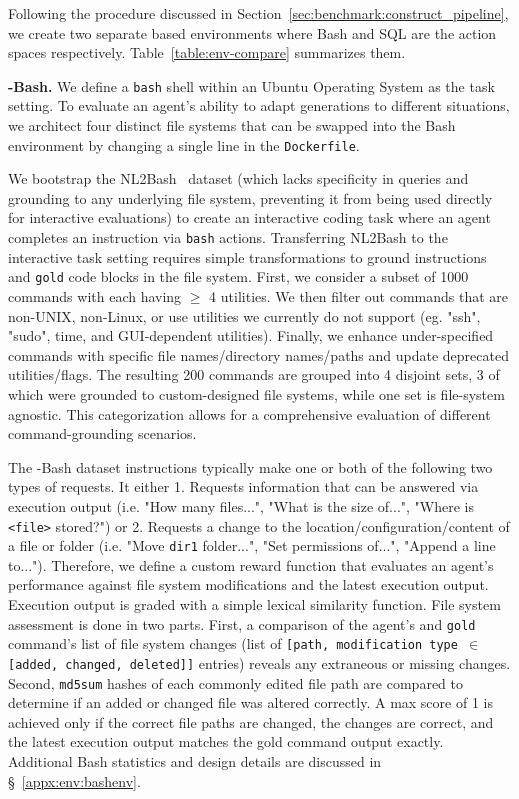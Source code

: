 Following the procedure discussed in Section~\ref{sec:benchmark:construct_pipeline}, we create two separate \benchmark{} based environments where Bash and SQL are the action spaces respectively. Table~\ref{table:env-compare} summarizes them.



\textbf{\benchmark{}-Bash.} We define a \texttt{bash} shell within an Ubuntu Operating System as the task setting.
To evaluate an agent's ability to adapt generations to different situations, we architect four distinct file systems that can be swapped into the Bash environment by changing a single line in the \texttt{Dockerfile}.

We bootstrap the NL2Bash~\cite{lin-etal-2018-nl2bash} dataset (which lacks specificity in queries and grounding to any underlying file system, preventing it from being used directly for interactive evaluations) to create an interactive coding task where an agent completes an instruction via \texttt{bash} actions. Transferring NL2Bash to the interactive task setting requires simple transformations to ground instructions and \texttt{gold} code blocks in the file system. First, we consider a subset of 1000 commands with each having $\geq$ 4 utilities. We then filter out commands that are non-UNIX, non-Linux, or use utilities we currently do not support (eg. "ssh", "sudo", time, and GUI-dependent utilities). Finally, we enhance under-specified commands with specific file names/directory names/paths and update deprecated utilities/flags. The resulting 200 commands are grouped into 4 disjoint sets, 3 of which were grounded to custom-designed file systems, while one set is file-system agnostic. This categorization allows for a comprehensive evaluation of different command-grounding scenarios.

The \benchmark{}-Bash dataset instructions typically make one or both of the following two types of requests. It either
1. Requests information that can be answered via execution output (i.e. "How many files...", "What is the size of...", "Where is \texttt{<file>} stored?") or
2. Requests a change to the location/configuration/content of a file or folder (i.e. "Move \texttt{dir1} folder...", "Set permissions of...", "Append a line to...").
Therefore, we define a custom reward function that evaluates an agent's performance against file system modifications and the latest execution output.
Execution output is graded with a simple lexical similarity function.
File system assessment is done in two parts. First, a comparison of the agent's and \texttt{gold} command's list of file system changes (list of \texttt{[path, modification type $\in$ [added, changed, deleted]]} entries) reveals any extraneous or missing changes.
Second, \texttt{md5sum} hashes of each commonly edited file path are compared to determine if an added or changed file was altered correctly.
A max score of 1 is achieved only if the correct file paths are changed, the changes are correct, and the latest execution output matches the gold command output exactly. Additional Bash statistics and design details are discussed in \S~\ref{appx:env:bashenv}.

